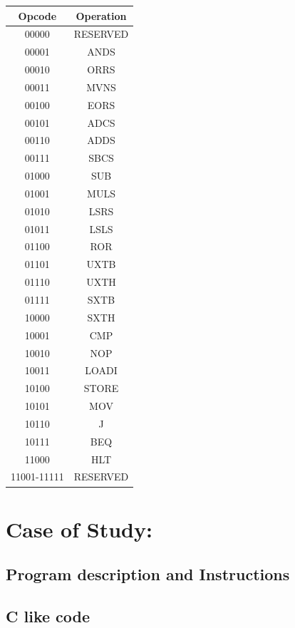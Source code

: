 \documentclass[9pt,a4paper,twoside]{tau}
\begin{document}
        \begingroup
        {\centering
        \begin{tabular}{c|c}
        \textbf{Opcode} & \textbf{Operation} \\ \hline
        00000 & RESERVED \\
        00001 & ANDS \\
        00010 & ORRS \\
        00011 & MVNS \\
        00100 & EORS \\
        00101 & ADCS \\
        00110 & ADDS \\
        00111 & SBCS \\
        01000 & SUB \\
        01001 & MULS \\
        01010 & LSRS \\
        01011 & LSLS \\
        01100 & ROR \\
        01101 & UXTB \\
        01110 & UXTH \\
        01111 & SXTB \\
        10000 & SXTH \\
        10001 & CMP \\
        10010 & NOP \\
        10011 & LOADI \\
        10100 & STORE \\
        10101 & MOV \\
        10110 & J \\
        10111 & BEQ \\
        11000 & HLT \\
        11001-11111 & RESERVED \\
        \end{tabular}}


    
        
 

\section{Case of Study:}
    \subsection{Program description and Instructions}
    \subsection{C like code}
\end{document}
